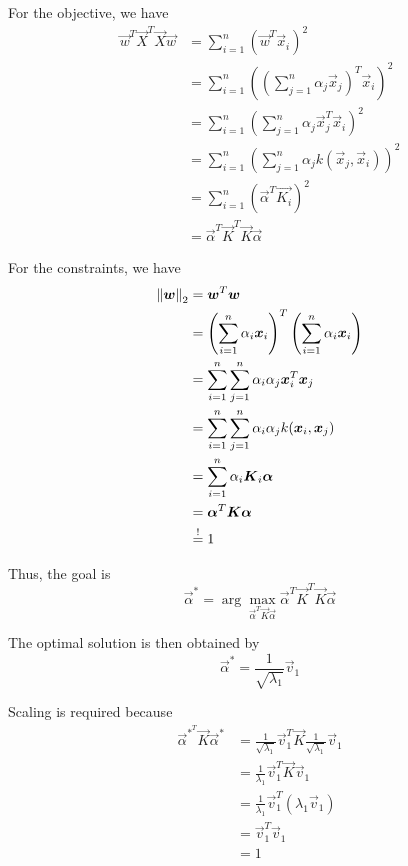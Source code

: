 For the objective, we have
\begin{align*}
    \vec{w}^T \vec{X}^T \vec{X} \vec{w} &=
        \sum_{i=1}^n{(\vec{w}^T \vec{x}_i)^2} \\
    &= \sum_{i=1}^n{\left((
        \sum_{j=1}^n{\alpha_j \vec{x}_j}
    )^T \vec{x}_i\right)^2} \\
    &= \sum_{i=1}^n{\left(
        \sum_{j=1}^n{\alpha_j \vec{x}_j^T \vec{x}_i}
    \right)^2} \\
    &= \sum_{i=1}^n{\left(
        \sum_{j=1}^n{\alpha_j k(\vec{x}_j, \vec{x}_i)}
    \right)^2} \\
    &= \sum_{i=1}^n{\left(
        \vec{\alpha}^T \vec{K_i}
    \right)^2} \\
    &= \vec{\alpha}^T \vec{K}^T \vec{K} \vec{\alpha}
\end{align*}

For the constraints, we have
\begin{align*}
    \left\lVert\boldsymbol{w}\right\rVert_2 &= \boldsymbol{w}^T \boldsymbol{w} \\
    &= \left(\sum_{i=1}^n{\alpha_i \boldsymbol{x}_i}\right)^T
        \left(\sum_{i=1}^n{\alpha_i \boldsymbol{x}_i}\right) \\
    &= \sum_{i=1}^n{
        \sum_{j=1}^n{
            \alpha_i \alpha_j \boldsymbol{x}_i^T \boldsymbol{x}_j
        }
    } \\
    &= \sum_{i=1}^n{
        \sum_{j=1}^n{
            \alpha_i \alpha_j k(\boldsymbol{x}_i, \boldsymbol{x}_j)
        }
    } \\
    &= \sum_{i=1}^n{
        \alpha_i \boldsymbol{K}_i \boldsymbol{\alpha}
    } \\
    &= \boldsymbol{\alpha}^T \boldsymbol{K} \boldsymbol{\alpha} \\
    &\overset{!}{=} 1
\end{align*}

Thus, the goal is
\begin{equation*}
    \vec{\alpha}^* = 
    \arg\max_{\vec{\alpha}^T \vec{K} \vec{\alpha}}{
        \vec{\alpha}^T \vec{K}^T \vec{K} \vec{\alpha}
    }
\end{equation*}

The optimal solution is then obtained by
\begin{equation*}
    \vec{\alpha}^* =
    \frac{1}{\sqrt{\lambda_1}} \vec{v}_1
\end{equation*}

Scaling is required because
\begin{align*}
    \vec{\alpha}^{*^T} \vec{K} \vec{\alpha}^* &=
        \frac{1}{\sqrt{\lambda_1}} \vec{v}_1^T
        \vec{K}
        \frac{1}{\sqrt{\lambda_1}} \vec{v}_1 \\
    &= \frac{1}{\lambda_1} \vec{v}_1^T \vec{K} \vec{v}_1 \\
    &= \frac{1}{\lambda_1} \vec{v}_1^T (\lambda_1 \vec{v}_1) \\
    &= \vec{v}_1^T \vec{v}_1 \\
    &= 1
\end{align*}


